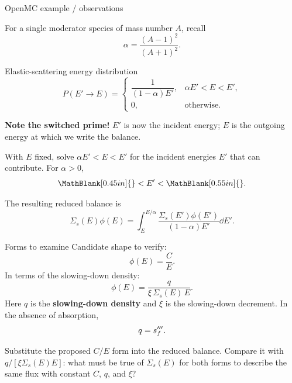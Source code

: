 \begin{handoutcolumns}
\begin{boardbox}{OpenMC example / observations}
\end{boardbox}

\switchcolumn
\RaggedRight
{}
For a single moderator species of mass number $A$, recall
$$
\alpha=\frac{(A-1)^2}{(A+1)^2}.
$$
\begin{fixedbox}{Elastic-scattering energy distribution}
$$
P(E'\!\to\!E)=
\begin{cases}
\dfrac{1}{(1-\alpha)E'},&\alpha E'<E<E',\\[4pt]
0,&\text{otherwise}.
\end{cases}
$$
\end{fixedbox}
\textbf{Note the switched prime!} $E'$ is now the incident energy;
$E$ is the outgoing energy at which we write the balance.

\begin{checkpoint}
With $E$ fixed, solve $\alpha E'<E<E'$ for the incident energies
$E'$ that can contribute. For $\alpha>0$,
$$
\MathBlank[0.45in]{}<E'<\MathBlank[0.55in]{}.
$$
\end{checkpoint}

The resulting reduced balance is
$$
\Sigma_s(E)\phi(E)=
\int_E^{E/\alpha}\frac{\Sigma_s(E')\phi(E')}{(1-\alpha)E'}\dd E'.
$$

\begin{fixedbox}{Forms to examine}
Candidate shape to verify:
$$
\phi(E)=\frac{C}{E}.
$$
In terms of the slowing-down density:
$$
\boxed{\displaystyle\phi(E)=\frac{q}{\xi\,\Sigma_s(E)\,E}}.
$$
Here $q$ is the \textbf{slowing-down density} and $\xi$ is the
slowing-down decrement. In the absence of absorption,
$$
q=s_f^{\prime\prime\prime}.
$$
\end{fixedbox}

\begin{checkpoint}
Substitute the proposed $C/E$ form into the reduced balance.
Compare it with $q/[\xi\Sigma_s(E)E]$: what must be true of
$\Sigma_s(E)$ for both forms to describe the same flux with constant
$C$, $q$, and $\xi$?
\end{checkpoint}
\end{handoutcolumns}


